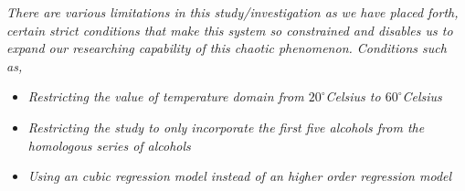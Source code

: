 \textit{There are various limitations in this study/investigation as we have placed forth, certain strict conditions that make this system so constrained and disables us to expand our researching capability of this chaotic phenomenon. Conditions such as,}
        
    \begin{itemize}
        \item \textit{Restricting the value of temperature domain from $20^\circ$Celsius to $60^\circ$Celsius}
        \item \textit{Restricting the study to only incorporate the first five alcohols from the homologous series of alcohols}
        \item \textit{Using an cubic regression model instead of an higher order regression model}
    \end{itemize}
        
        

